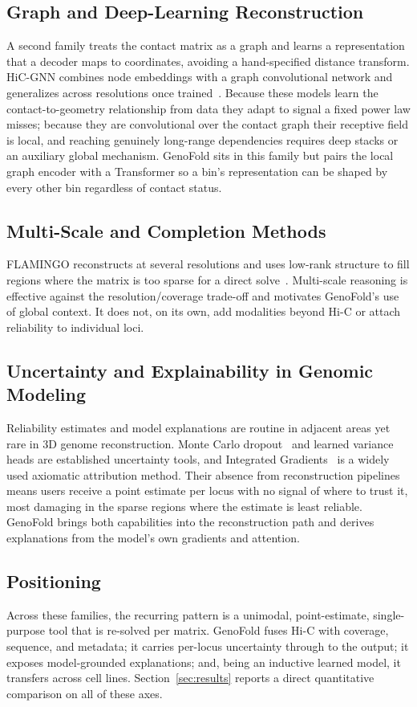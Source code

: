 \documentclass[conference]{IEEEtran}
\begin{document}
\subsection{Graph and Deep-Learning Reconstruction}
A second family treats the contact matrix as a graph and learns a representation
that a decoder maps to coordinates, avoiding a hand-specified distance transform.
HiC-GNN combines node embeddings with a graph convolutional network and
generalizes across resolutions once trained~\cite{hicgnn2022}. Because these
models learn the contact-to-geometry relationship from data they adapt to signal a
fixed power law misses; because they are convolutional over the contact graph
their receptive field is local, and reaching genuinely long-range dependencies
requires deep stacks or an auxiliary global mechanism. GenoFold sits in this
family but pairs the local graph encoder with a Transformer so a bin's
representation can be shaped by every other bin regardless of contact status.

\subsection{Multi-Scale and Completion Methods}
FLAMINGO reconstructs at several resolutions and uses low-rank structure to fill
regions where the matrix is too sparse for a direct solve~\cite{flamingo2022}.
Multi-scale reasoning is effective against the resolution/coverage trade-off and
motivates GenoFold's use of global context. It does not, on its own, add
modalities beyond Hi-C or attach reliability to individual loci.

\subsection{Uncertainty and Explainability in Genomic Modeling}
Reliability estimates and model explanations are routine in adjacent areas yet
rare in 3D genome reconstruction. Monte Carlo dropout~\cite{gal2016} and learned
variance heads are established uncertainty tools, and Integrated
Gradients~\cite{sundararajan2017} is a widely used axiomatic attribution method.
Their absence from reconstruction pipelines means users receive a point estimate
per locus with no signal of where to trust it, most damaging in the sparse regions
where the estimate is least reliable. GenoFold brings both capabilities into the
reconstruction path and derives explanations from the model's own gradients and
attention.

\subsection{Positioning}
Across these families, the recurring pattern is a unimodal, point-estimate,
single-purpose tool that is re-solved per matrix. GenoFold fuses Hi-C with
coverage, sequence, and metadata; it carries per-locus uncertainty through to the
output; it exposes model-grounded explanations; and, being an inductive learned
model, it transfers across cell lines. Section~\ref{sec:results} reports a direct
quantitative comparison on all of these axes.
\end{document}

